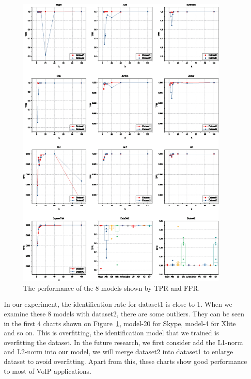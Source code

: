 \documentclass[conference]{IEEEtran}
\begin{document}
\begin{figure}[htp]
\begin{center}
\includegraphics[width=0.95\textwidth]{fprtpr.eps}
\caption{The performance of the 8 models shown by TPR and FPR.}\label{fig:fprtpr}
\end{center}
\end{figure}

In our experiment, the identification rate for dataset1 is close to 1. When we examine these 8 models with dataset2, there are some outliers. They can be seen in the first 4 charts shown on Figure~\ref{fig:fprtpr}, model-20 for Skype, model-4 for Xlite and so on. This is overfitting, the identification model that we trained is overfitting the dataset. In the future research, we first consider add the L1-norm and L2-norm into our model, we will merge dataset2 into dataset1 to enlarge dataset to avoid overfitting. Apart from this, these charts show good performance to most of VoIP applications.
\end{document}
